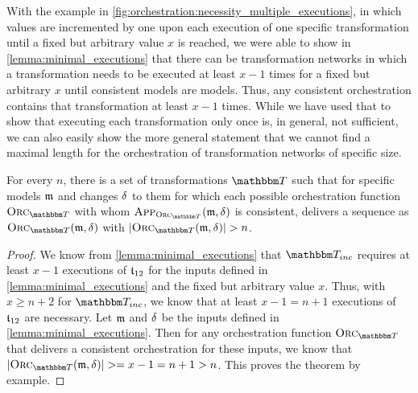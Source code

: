 
With the example in \autoref{fig:orchestration:necessity_multiple_executions}, in which values are incremented by one upon each execution of one specific transformation until a fixed but arbitrary value $x$ is reached, we were able to show in \autoref{lemma:minimal_executions} that there can be transformation networks in which a transformation needs to be executed at least $x-1$ times for a fixed but arbitrary $x$ until consistent models are models.
Thus, any consistent orchestration contains that transformation at least $x-1$ times.
While we have used that to show that executing each transformation only once is, in general, not sufficient, we can also easily show the more general statement that we cannot find a maximal length for the orchestration of transformation networks of specific size.

\begin{theorem}
    \label{theorem:orchestration_fixed}
    For every $n$, there is a set of transformations $\transformationset{T}$ such that for specific models $\mathfrak{m}$ and changes $\mathfrak{\delta}_{}$ to them for which each possible orchestration function $\orcfunction{\transformationset{T}}$ with whom $\appfunction{\orcfunction{\transformationset{T}}}(\modeltuple{m}, \changetuple{})$ is consistent, delivers a sequence as $\orcfunction{\transformationset{T}}(\modeltuple{m}, \changetuple{})$ with $\abs{\orcfunction{\transformationset{T}}(\modeltuple{m}, \changetuple{})} > n$.
\end{theorem}
\begin{proof}
    We know from \autoref{lemma:minimal_executions} that $\transformationset{T}_{inc}$ requires at least $x-1$ executions of $\mathfrak{t}_{12}$ for the inputs defined in \autoref{lemma:minimal_executions} and the fixed but arbitrary value $x$.
    Thus, with $x \geq n+2$ for $\transformationset{T}_{inc}$, we know that at least $x-1 = n+1$ executions of $\mathfrak{t}_{12}$ are necessary.
    Let $\mathfrak{m}$ and $\mathfrak{\delta}_{}$ be the inputs defined in \autoref{lemma:minimal_executions}.
    Then for any orchestration function $\orcfunction{\transformationset{T}}$ that delivers a consistent orchestration for these inputs, we know that $\abs{\orcfunction{\transformationset{T}}(\modeltuple{m}, \changetuple{})} >= x-1 = n+1 > n$.
    This proves the theorem by example.
\end{proof}

